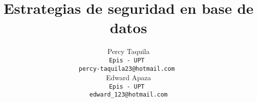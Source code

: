 \documentclass[11pt]{article}
\title{Estrategias de seguridad en base de datos}
\author{Percy Taquila \\
  {\tt Epis - UPT } \\
  {\tt percy-taquila23@hotmail.com } \\\And
  {Edward Apaza \\
  {\tt Epis - UPT } \\
  {\tt edward_123@hotmail.com}}}
\begin{document}
\maketitle
\date{}





\end{document}
